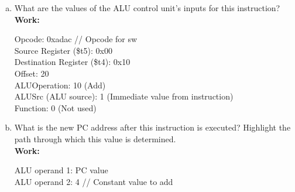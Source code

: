 \documentclass[11pt]{article}
\begin{document}
\begin{enumerate}[(a)]
    \item What are the values of the ALU control unit's inputs for this instruction?\\
    \textbf{Work:}
    \begin{center}
        Opcode: 0xadac // Opcode for sw\\
        Source Register (\$t5): 0x00\\
        Destination Register (\$t4): 0x10\\
        Offset: 20\\
        ALUOperation: 10 (Add)\\
        ALUSrc (ALU source): 1 (Immediate value from instruction)\\
        Function: 0 (Not used)\\
    \end{center}

    \item What is the new PC address after this instruction is executed? Highlight the path through which this value is determined.\\
    \textbf{Work:}
    \begin{center}
        ALU operand 1: PC value\\
        ALU operand 2: 4 // Constant value to add \\
    \end{center}


\end{enumerate}
\end{document}
